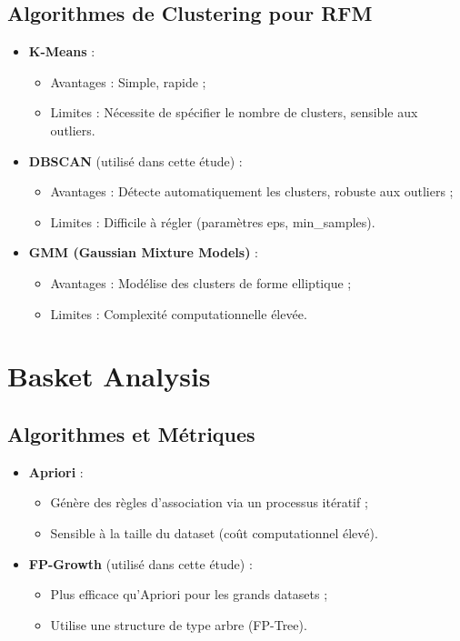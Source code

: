 \documentclass[a4paper,12pt]{article}
\begin{document}
\subsection{Algorithmes de Clustering pour RFM}
\begin{itemize}
    \item \textbf{K-Means} :
    \begin{itemize}
        \item Avantages : Simple, rapide ;
        \item Limites : Nécessite de spécifier le nombre de clusters, sensible aux outliers.
    \end{itemize}
    \item \textbf{DBSCAN} (utilisé dans cette étude) :
    \begin{itemize}
        \item Avantages : Détecte automatiquement les clusters, robuste aux outliers ;
        \item Limites : Difficile à régler (paramètres eps, min\_samples).
    \end{itemize}
    \item \textbf{GMM (Gaussian Mixture Models)} :
    \begin{itemize}
        \item Avantages : Modélise des clusters de forme elliptique ;
        \item Limites : Complexité computationnelle élevée.
    \end{itemize}
\end{itemize}

\section{Basket Analysis}

\subsection{Algorithmes et Métriques}
\begin{itemize}
    \item \textbf{Apriori} :
    \begin{itemize}
        \item Génère des règles d'association via un processus itératif ;
        \item Sensible à la taille du dataset (coût computationnel élevé).
    \end{itemize}
    \item \textbf{FP-Growth} (utilisé dans cette étude) :
    \begin{itemize}
        \item Plus efficace qu'Apriori pour les grands datasets ;
        \item Utilise une structure de type arbre (FP-Tree).
    \end{itemize}
\end{itemize}
\end{document}
